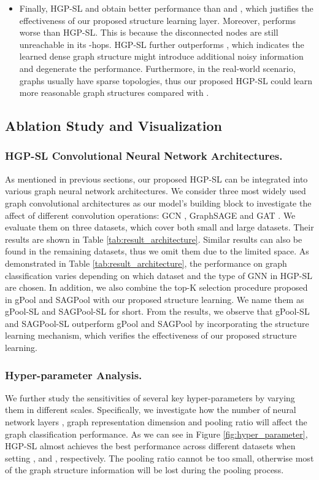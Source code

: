 \documentclass[letterpaper]{article} \usepackage{aaai20}  \usepackage{times}  \usepackage{helvet} \usepackage{courier}  \usepackage[hyphens]{url}  \usepackage{graphicx} \urlstyle{rm} \def\UrlFont{\rm}  \usepackage{graphicx}  \frenchspacing  \setlength{\pdfpagewidth}{8.5in}  \setlength{\pdfpageheight}{11in}
\begin{document}
\begin{itemize}
	\item Finally, HGP-SL and  obtain better performance than  and , which justifies the effectiveness of our proposed structure learning layer. Moreover,  performs worse than HGP-SL. This is because the disconnected nodes are still unreachable in its -hops. HGP-SL further outperforms , which indicates the learned dense graph structure might introduce additional noisy information and degenerate the performance. Furthermore, in the real-world scenario, graphs usually have sparse topologies, thus our proposed HGP-SL could learn more reasonable graph structures compared with .
\end{itemize}

\subsection{Ablation Study and Visualization}
\subsubsection{HGP-SL Convolutional Neural Network Architectures.}
As mentioned in previous sections, our proposed HGP-SL can be integrated into various graph neural network architectures. We consider three most widely used graph convolutional architectures as our model's building block to investigate the affect of different convolution operations: GCN \cite{kipf2016semi}, GraphSAGE \cite{hamilton2017inductive} and GAT \cite{velivckovic2017graph}. We evaluate them on three datasets, which cover both small and large datasets. Their results are shown in Table \ref{tab:result_architecture}. Similar results can also be found in the remaining datasets, thus we omit them due to the limited space. As demonstrated in Table \ref{tab:result_architecture}, the performance on graph classification varies depending on which dataset and the type of GNN in HGP-SL are chosen. In addition, we also combine the top-K selection procedure proposed in gPool and SAGPool with our proposed structure learning. We name them as gPool-SL and SAGPool-SL for short. From the results, we observe that gPool-SL and SAGPool-SL outperform gPool and SAGPool by incorporating the structure learning mechanism, which verifies the effectiveness of our proposed structure learning.
\subsubsection{Hyper-parameter Analysis.}
We further study the sensitivities of several key hyper-parameters by varying them in different scales. Specifically, we investigate how the number of neural network layers , graph representation dimension  and pooling ratio  will affect the graph classification performance. As we can see in Figure \ref{fig:hyper_parameter}, HGP-SL almost achieves the best performance across different datasets when setting ,  and , respectively. The pooling ratio  cannot be too small, otherwise most of the graph structure information will be lost during the pooling process. 
\end{document}
